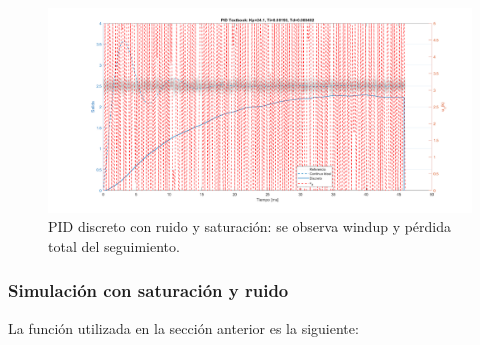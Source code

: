 \begin{figure}[!t]
	\centering
	\includegraphics[width=\columnwidth]{img/sat_noise.png}
	\caption{PID discreto con ruido y saturación: se observa windup y pérdida total del seguimiento.}
	\label{fig:sat_noise}
\end{figure}


\onecolumn
\subsubsection*{Simulación con saturación y ruido}

La función utilizada en la sección anterior es la siguiente:

